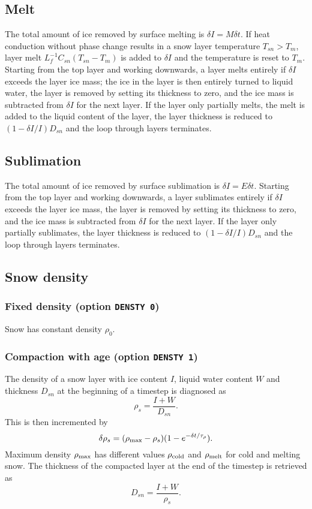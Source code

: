 \documentclass[fleqn]{article}
\begin{document}
\subsection{Melt}
The total amount of ice removed by surface melting is $\delta I = M\delta t$. If heat conduction without phase change results in a snow layer temperature $T_{sn} > T_m$, layer melt $L_f^{-1}C_{sn}(T_{sn} - T_m)$ is added to $\delta I$ and the temperature is reset to $T_m$. Starting from the top layer and working downwards, a layer melts entirely if $\delta I$ exceeds the layer ice mass; the ice in the layer is then entirely turned to liquid water, the layer is removed by setting its thickness to zero, and the ice mass is subtracted from $\delta I$ for the next layer. If the layer only partially melts, the melt is added to the liquid content of the layer, the layer thickness is reduced to $(1 - \delta I/I)D_{sn}$ and the loop through layers terminates. 

\subsection{Sublimation}
The total amount of ice removed by surface sublimation is $\delta I = E\delta t$. Starting from the top layer and working downwards, a layer sublimates entirely if $\delta I$ exceeds the layer ice mass, the layer is removed by setting its thickness to zero, and the ice mass is subtracted from $\delta I$ for the next layer. If the layer only partially sublimates, the layer thickness is reduced to $(1 - \delta I/I)D_{sn}$ and the loop through layers terminates.

\subsection{Snow density}

\subsubsection{Fixed density (option {\tt DENSTY 0})}

Snow has constant density $\rho_0$.

\subsubsection{Compaction with age (option {\tt DENSTY 1})}

The density of a snow layer with ice content $I$, liquid water content $W$ and thickness $D_{sn}$ at the beginning of a timestep is diagnosed as
\begin{equation}
\rho_s = \frac{I + W}{D_{sn}}.
\end{equation}
This is then incremented by
\begin{equation}
\delta\rho_s = (\rho_{\rm max} - \rho_s)(1 - e^{-\delta t/\tau_\rho}).
\end{equation}
Maximum density $\rho_{\rm max}$ has different values $\rho_{\rm cold}$ and $\rho_{\rm melt}$ for cold and melting snow. The thickness of the compacted layer at the end of the timestep is retrieved as
\begin{equation}
D_{sn} = \frac{I + W}{\rho_s}.
\end{equation}
\end{document}
